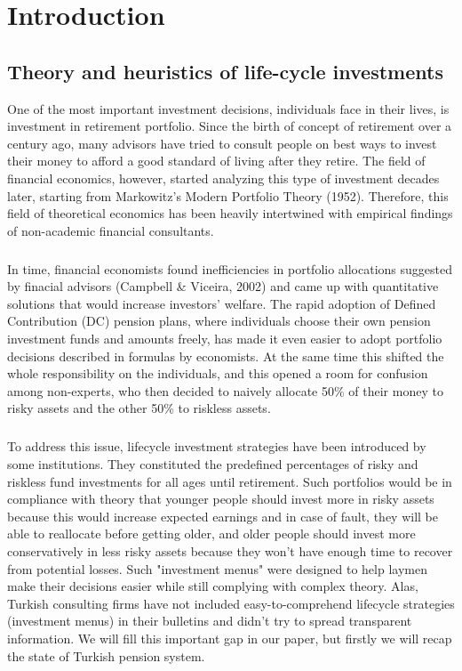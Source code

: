 \chapter{Introduction} %
\label{intro} %


\section{Theory and heuristics of life-cycle investments}
One of the most important investment decisions, individuals face in their lives, is investment in retirement portfolio. Since the birth of concept of retirement over a century ago, many advisors have tried to consult people on best ways to invest their money to afford a good standard of living after they retire. The field of financial economics, however, started analyzing this type of investment decades later, starting from Markowitz's Modern Portfolio Theory (1952). Therefore, this field of theoretical economics has been heavily intertwined with empirical findings of non-academic financial consultants.
\paragraph*{}
In time, financial economists found inefficiencies in portfolio allocations suggested by finacial advisors (Campbell \& Viceira, 2002) and came up with quantitative solutions that would increase investors' welfare. The rapid adoption of Defined Contribution (DC) pension plans, where individuals choose their own pension investment funds and amounts freely, has made it even easier to adopt portfolio decisions described in formulas by economists. At the same time this shifted the whole responsibility on the individuals, and this opened a room for confusion among non-experts, who then decided to naively allocate 50\% of their money to risky assets and the other 50\% to riskless assets.
\paragraph*{} 
To address this issue, lifecycle investment strategies have been introduced by some institutions. They constituted the predefined percentages of risky and riskless fund investments for all ages until retirement. Such portfolios would be in compliance with theory that younger people should invest more in risky assets because this would increase expected earnings and in case of fault, they will be able to reallocate before getting older, and older people should invest more conservatively in less risky assets because they won't have enough time to recover from potential losses. Such "investment menus" were designed to help laymen make their decisions easier while still complying with complex theory. Alas, Turkish consulting firms have not included easy-to-comprehend lifecycle strategies (investment menus) in their bulletins and didn't try to spread transparent information. We will fill this important gap in our paper, but firstly we will recap the state of Turkish pension system.

